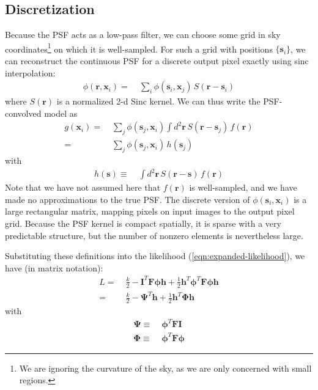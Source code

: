 \documentclass[10pt]{article}
\newcommand{\eqnref}[1]{(\ref{eqn:#1})}
\begin{document}
\subsection{Discretization}
\label{sec:discretization}

Because the PSF acts as a low-pass filter, we can choose some grid in sky coordinates\footnote{We are ignoring the curvature of the sky, as we are only concerned with small regions.} on which it is well-sampled.  For such a grid with positions $\{\bm{s}_i\}$, we can reconstruct the continuous PSF for a discrete output pixel exactly using sinc interpolation:
\begin{align}
\phi(\bm{r},\bm{x}_i) =\;& \sum_{i} \phi(\bm{s}_i,\bm{x}_j)\,
    S(\bm{r}-\bm{s}_i)
    \label{eqn:phi-interpolated}
\end{align}
where $S(\bm{r})$ is a normalized 2-d Sinc kernel.  We can thus write the PSF-convolved model as
\begin{align}
g(\bm{x}_i) =\;& \sum_{j} \phi(\bm{s}_j,\bm{x}_i)
    \int\! d^2 \bm{r} \, S(\bm{r}-\bm{s}_j) \, f(\bm{r}) \\
    =\;& \sum_{j} \phi(\bm{s}_j,\bm{x}_i) \, h(\bm{s}_j)
\end{align}
with
\begin{align}
h(\bm{s}) \equiv\;& \int\! d^2 \bm{r} \, S(\bm{r}-\bm{s}) \, f(\bm{r})
\end{align}
Note that we have not assumed here that $f(\bm{r})$ is well-sampled, and we have made no approximations to the true PSF.  The discrete version of $\phi(\bm{s}_i,\bm{x}_i)$ is a large rectangular matrix, mapping pixels on input images to the output pixel grid.  Because the PSF kernel is compact spatially, it is sparse with a very predictable structure, but the number of nonzero elements is nevertheless large.

Substituting these definitions into the likelihood \eqnref{expanded-likelihood}, we have (in matrix notation):
\begin{align}
L
=\;&
    \frac{k}{2} - \bm{I}^T \! \bm{F} \bm{\phi} \bm{h}
    + \frac{1}{2} \bm{h}^T \! \bm{\phi}^T \! \bm{F} \bm{\phi} \bm{h} \\
=\;& \frac{k}{2} - \bm{\Psi}^T\!\bm{h} + \frac{1}{2}\bm{h}^T\!\bm{\Phi}\bm{h}
\label{eqn:expanded-likelihood-new}
\end{align}
with
\begin{align}
\bm{\Psi} \equiv\;& \bm{\phi}^T\!\bm{F} \bm{I}
    \label{eqn:psi-def}
    \\
\bm{\Phi} \equiv\;& \bm{\phi}^T\!\bm{F} \bm{\phi}
\label{eqn:phi-def}
\end{align}
\end{document}
